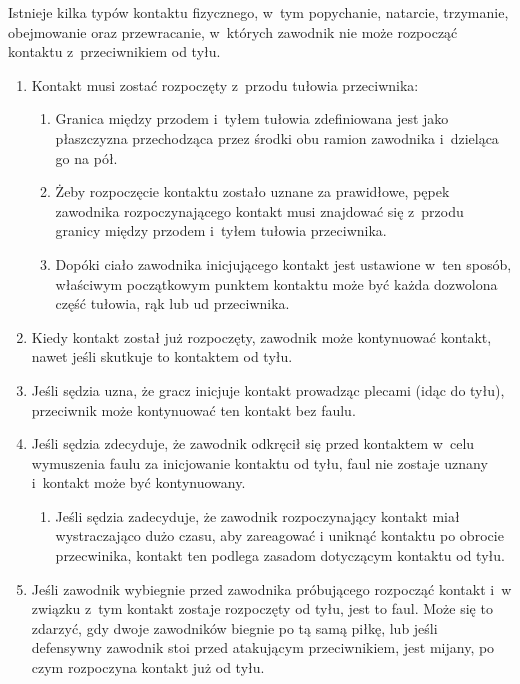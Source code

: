 \documentclass[12pt,a4paper]{article}
\renewcommand{\paragraph}[1]{
  \oldparagraph{#1}%
  \leftskip2cm
}
\begin{document}
\paragraph{Miejsce rozpoczęcia kontaktu}
Istnieje kilka typów
kontaktu fizycznego, w~tym popychanie, natarcie, trzymanie, obejmowanie
oraz przewracanie, w~których zawodnik nie może rozpocząć kontaktu z~przeciwnikiem od tyłu.

\begin{enumerate}
	\item
	      Kontakt musi zostać rozpoczęty z~przodu tułowia przeciwnika:

	      \begin{enumerate}
		      \item
		            Granica między przodem i~tyłem tułowia zdefiniowana jest jako
		            płaszczyzna przechodząca przez środki obu ramion zawodnika i~dzieląca go na pół.
		      \item
		            Żeby rozpoczęcie kontaktu zostało uznane za prawidłowe, pępek
		            zawodnika rozpoczynającego kontakt musi znajdować się z~przodu
		            granicy między przodem i~tyłem tułowia przeciwnika.
		      \item
		            Dopóki ciało zawodnika inicjującego kontakt jest ustawione w~ten
		            sposób, właściwym początkowym punktem kontaktu może być każda
		            dozwolona część tułowia, rąk lub ud przeciwnika.
	      \end{enumerate}
	\item
	      Kiedy kontakt został już rozpoczęty, zawodnik może kontynuować
		kontakt, nawet jeśli skutkuje to kontaktem od tyłu.
	\item
		Jeśli sędzia uzna, że gracz inicjuje kontakt prowadząc plecami (idąc do tyłu), przeciwnik może kontynuować ten kontakt bez faulu.
	\item
	      Jeśli sędzia zdecyduje, że zawodnik odkręcił się przed kontaktem w~celu wymuszenia faulu za inicjowanie kontaktu od tyłu, faul nie
		zostaje uznany i~kontakt może być kontynuowany.
		\begin{enumerate}
			\item 
				Jeśli sędzia zadecyduje, że zawodnik rozpoczynający kontakt miał wystraczająco dużo czasu, aby zareagować i uniknąć kontaktu po obrocie przecwinika, kontakt ten podlega zasadom dotyczącym kontaktu od tyłu.
		\end{enumerate}
	\item
	      Jeśli zawodnik wybiegnie przed zawodnika próbującego rozpocząć kontakt
	      i~w związku z~tym kontakt zostaje rozpoczęty od tyłu, jest to faul.
	      Może się to zdarzyć, gdy dwoje zawodników biegnie po tą samą piłkę,
	      lub jeśli defensywny zawodnik stoi przed atakującym przeciwnikiem,
	      jest mijany, po czym rozpoczyna kontakt już od tyłu.
\end{enumerate}
\end{document}
